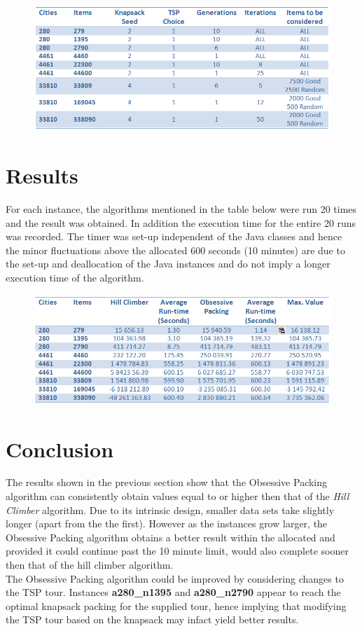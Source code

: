 \documentclass[a4paper,12pt]{article}
\begin{document}
\begin{figure}[h]
\centering
\includegraphics[width=\linewidth]{ParamsTable.png}
\end{figure}

\newpage
\section{Results}
For each instance, the algorithms mentioned in the table below were run 20 times and the result was obtained. In addition the execution time for the entire 20 runs was recorded. The timer was set-up independent of the Java classes and hence the minor fluctuations above the allocated 600 seconds (10 minutes) are due to the set-up and deallocation of the Java instances and do not imply a longer execution time of the algorithm.
\begin{figure}[h]
\centering
\includegraphics[width=\linewidth]{ResultsTable.png}
\end{figure}

\section{Conclusion}
The results shown in the previous section show that the Obsessive Packing algorithm can consistently obtain values equal to or higher then that of the \textit{Hill Climber} algorithm. Due to its intrinsic design, smaller data sets take slightly longer (apart from the the first). However as the instances grow larger,  the Obsessive Packing algorithm obtains a better result within the allocated and provided it could continue past the 10 minute limit, would also complete sooner then that of the hill climber algorithm.\\

The Obsessive Packing algorithm could be improved by considering changes to the TSP tour. Instances {\bf a280\_n1395} and {\bf a280\_n2790} appear to reach the optimal knapsack packing for the supplied tour, hence implying that modifying the TSP tour based on the knapsack may infact yield better results.
\end{document}
